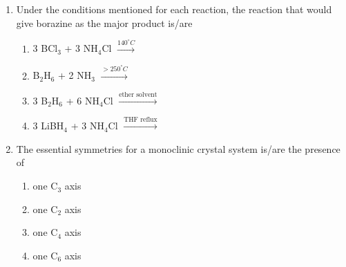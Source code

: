 \documentclass[journal,12pt,onecolumn]{IEEEtran}
\theoremstyle{remark}
\begin{document}
\begin{enumerate}
\item Under the conditions mentioned for each reaction, the reaction that would give borazine  as the major product is/are
    \begin{enumerate}
        \item 3 BCl$_{3}$ + 3 NH$_{4}$Cl $\xrightarrow{140^{\circ}C}$
        \item B$_{2}$H$_{6}$ + 2 NH$_{3}$ $\xrightarrow{>250^{\circ}C}$
        \item 3 B$_{2}$H$_{6}$ + 6 NH$_{4}$Cl $\xrightarrow{\text{ether solvent}}$
        \item 3 LiBH$_{4}$ + 3 NH$_{4}$Cl $\xrightarrow{\text{THF reflux}}$
    \end{enumerate}      \hfill{}



\item The essential symmetries for a monoclinic crystal system is/are the presence of
    \begin{enumerate}
        \item one C$_{3}$ axis
        \item one C$_{2}$ axis
        \item one C$_{4}$ axis
        \item one C$_{6}$ axis
    \end{enumerate}      \hfill{}




\end{enumerate}
\end{document}
